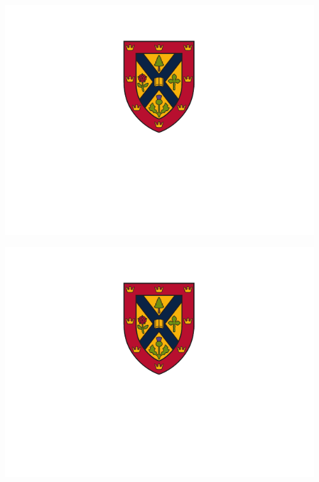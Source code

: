 \documentclass[fleqn]{qu-slides}
\begin{document}
\SlideBlue 
\begin{frame}[plain]
    \centering
    \includegraphics[height=0.9\textheight]{logo/qu-logo-vertical-reverse.pdf}
\end{frame}


\SlideRed
\begin{frame}[plain]
    \centering
    \includegraphics[height=0.9\textheight]{logo/qu-logo-vertical-reverse.pdf}
\end{frame}

\end{document}
